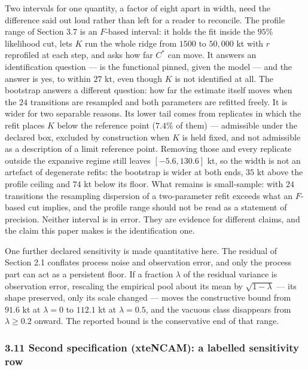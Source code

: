 Two intervals for one quantity, a factor of eight apart in width, need
the difference said out loud rather than left for a reader to reconcile.
The profile range of Section 3.7 is an \(F\)-based interval: it holds
the fit inside the \(95\%\) likelihood cut, lets \(K\) run the whole
ridge from \(1500\) to \(50{,}000\) kt with \(r\) reprofiled at each
step, and asks how far \(C^*\) can move. It answers an identification
question --- is the functional pinned, given the model --- and the answer
is yes, to within \(27\) kt, even though \(K\) is not identified at
all. The bootstrap answers a different question: how far the estimate
itself moves when the \(24\) transitions are resampled and both
parameters are refitted freely. It is wider for two separable reasons.
Its lower tail comes from replicates in which the refit places \(K\)
below the reference point (\(7.4\%\) of them) --- admissible under the
declared box, excluded by construction when \(K\) is held fixed, and
not admissible as a description of a limit reference point. Removing
those and every replicate outside the expansive regime still leaves
\([-5.6, 130.6]\) kt, so the width is not an artefact of degenerate
refits: the bootstrap is wider at both ends, \(35\) kt above the profile
ceiling and \(74\) kt below its floor. What remains is small-sample:
with \(24\) transitions the resampling dispersion of a two-parameter
refit exceeds what an \(F\)-based cut implies, and the profile range
should not be read as a statement of precision. Neither interval is in
error. They are evidence for different claims, and the claim this paper
makes is the identification one.

One further declared sensitivity is made quantitative here. The residual of
Section 2.1 conflates process noise and observation error, and only the process
part can act as a persistent floor. If a fraction \(\lambda\) of the residual
variance is observation error, rescaling the empirical pool about its mean by
\(\sqrt{1-\lambda}\) --- its shape preserved, only its scale changed ---
moves the constructive bound from \(91.6\) kt at \(\lambda = 0\) to
\(112.1\) kt at \(\lambda = 0.5\), and the vacuous class disappears from
\(\lambda \ge 0.2\) onward. The reported bound is the conservative end of
that range.

\subsubsection{3.11 Second specification (xteNCAM): a labelled
sensitivity
row}\label{budget-second-specification-xtencam-a-labelled-sensitivity-row}

